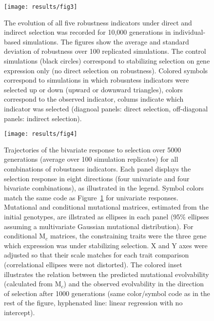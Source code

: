 \documentclass[10pt,a4paper]{article}
\begin{document}
\begin{figure}[tp!]
\begin{adjustwidth}{-1.5in}{0in}
\begin{flushright}
\texttt{[image: results/fig3]}
\caption{\color{Gray} \label{fig:evol} The evolution of all five robustness indicators under direct and indirect selection was recorded for 10,000 generations in individual-based simulations. The figures show the average and standard deviation of robustness over 100 replicated simulations. The control simulations (black circles) correspond to stabilizing selection on gene expression only (no direct selection on robustness). Colored symbols correspond to simulations in which robusntess indicators were selected up or down (upward or downward triangles), colors correspond to the observed indicator, colums indicate which indicator was selected (diagnoal panels: direct selection, off-diagonal panels: indirect selection).}
\end{flushright}\end{adjustwidth}
\end{figure}

\begin{figure}[thp!]
\begin{adjustwidth}{-1in}{0in}
\begin{flushright}
\texttt{[image: results/fig4]}
\caption{\color{Gray} \label{fig:evolvability} Trajectories of the bivariate response to selection over 5000 generations (average over 100 simulation replicates) for all combinations of robustness indicators. Each panel displays the selection response in eight directions (four univariate and four bivariate combinations), as illustrated in the legend. Symbol colors match the same code as Figure~\ref{fig:evol} for univariate responses. Mutational and conditional mutational matrices, estimated from the initial genotypes, are illstrated as ellipses in each panel (95\% ellipses assuming a multivariate Gaussian mutational distribution). For conditional $\bm{\mathrm M}_c$ matrices, the constraining traits were the three gene which expression was under stabilizing selection. X and Y axes were adjusted so that their scale matches for each trait comparison (correlational ellipses were not distorted). The colored inset illustrates the relation between the predicted mutational evolvability (calculated from $\bm{\mathrm M}_c$) and the observed evolvability in the direction of selection after 1000 generations (same color/symbol code as in the rest of the figure, hyphenated line: linear regression with no intercept). }
\end{flushright}\end{adjustwidth}
\end{figure}
\end{document}

